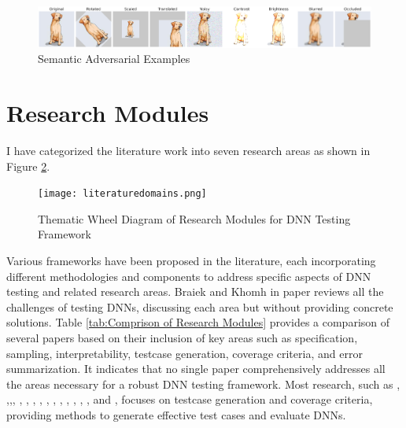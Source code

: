   \begin{figure}
    \centering
    \includegraphics[width=\linewidth]{figures/output_update.png}
    \caption{Semantic Adversarial Examples}
    \label{fig:image-trans}
  \end{figure}


\section{Research Modules}

I have categorized the literature work into seven research areas as shown in Figure \ref{fig:thematic_wheel}. 
\begin{figure}[h]
  \centering
  \texttt{[image: literaturedomains.png]}
  \caption{Thematic Wheel Diagram of Research Modules for DNN Testing Framework}
  \label{fig:thematic_wheel}
\end{figure}

Various frameworks have been proposed in the literature, each incorporating different methodologies and components to address specific aspects of DNN testing and related research areas. Braiek and Khomh in paper \cite{Braiek} reviews all the challenges of testing DNNs, discussing each area but without providing concrete solutions. Table \ref{tab:Comprison of Research Modules} provides a comparison of several papers based on their inclusion of key areas such as specification, sampling, interpretability, testcase generation, coverage criteria, and error summarization.
 It indicates that no single paper comprehensively addresses all the areas necessary for a robust DNN testing framework.  Most research, such as \cite{Sekhon},  \cite{deeptest},\cite{deepxplore},\cite{Wicker}, \cite{Ma}, \cite{SunY}, \cite{Sun}, \cite{Cheng}, \cite{Kim}, \cite{Concolic}, \cite{Deepconcolic}, \cite{tensorfuzz}, \cite{Deephunter}, \cite{DLFuzz}, \cite{Sayah}, and \cite{Dola}, focuses on testcase generation and coverage criteria, providing methods to generate effective test cases and evaluate DNNs. 


